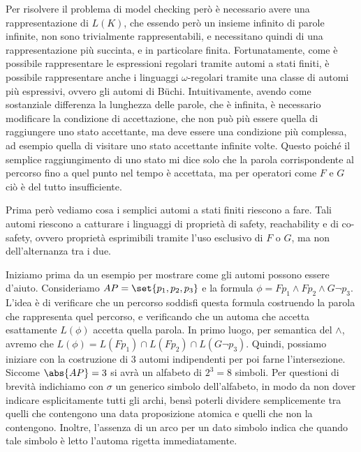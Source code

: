 Per risolvere il problema di model checking però è necessario avere una rappresentazione di \(L(K)\), che essendo però un insieme infinito di parole infinite, non sono trivialmente rappresentabili, e necessitano quindi di una rappresentazione più succinta, e in particolare finita.
Fortunatamente, come è possibile rappresentare le espressioni regolari tramite automi a stati finiti, è possibile rappresentare anche i linguaggi \(\omega\)-regolari tramite una classe di automi più espressivi, ovvero gli automi di Büchi. Intuitivamente, avendo come sostanziale differenza la lunghezza delle parole, che è infinita, è necessario modificare la condizione di accettazione, che non può più essere quella di raggiungere uno stato accettante, ma deve essere una condizione più complessa, ad esempio quella di visitare uno stato accettante infinite volte. Questo poiché il semplice raggiungimento di uno stato mi dice solo che la parola corrispondente al percorso fino a quel punto nel tempo è accettata, ma per operatori come \(F\) e \(G\) ciò è del tutto insufficiente.

Prima però vediamo cosa i semplici automi a stati finiti riescono a fare. Tali automi riescono a catturare i linguaggi di proprietà di safety, reachability e di co-safety, ovvero proprietà esprimibili tramite l'uso esclusivo di \(F\) o \(G\), ma non dell'alternanza tra i due.

Iniziamo prima da un esempio per mostrare come gli automi possono essere d'aiuto. Consideriamo \(AP = \set{p_1, p_2, p_3}\) e la formula \(\phi =  Fp_1 \land Fp_2 \land G \neg p_3\).
L'idea è di verificare che un percorso soddisfi questa formula costruendo la parola che rappresenta quel percorso, e verificando che un automa che accetta esattamente \(L(\phi)\) accetta quella parola. In primo luogo, per semantica del \(\land\), avremo che \(L(\phi) = L(Fp_1) \cap L(Fp_2) \cap L(G \neg p_3)\). Quindi, possiamo iniziare con la costruzione di \(3\) automi indipendenti per poi farne l'intersezione.
Siccome \(\abs{AP} = 3\) si avrà un alfabeto di \(2^3 = 8\) simboli. Per questioni di brevità indichiamo con \(\sigma\) un generico simbolo dell'alfabeto, in modo da non dover indicare esplicitamente tutti gli archi, bensì poterli dividere semplicemente tra quelli che contengono una data proposizione atomica e quelli che non la contengono. Inoltre, l'assenza di un arco per un dato simbolo indica che quando tale simbolo è letto l'automa rigetta immediatamente.

